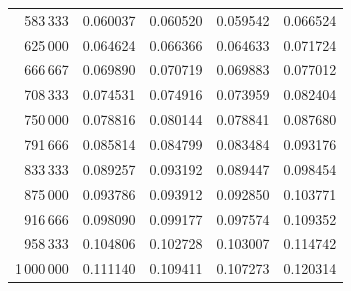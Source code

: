 \begin{table}[!h]
\begin{tabular}{r|rrrr}
        583\,333    & 0.060037        & 0.060520        & 0.059542     & 0.066524  \\
        625\,000    & 0.064624        & 0.066366        & 0.064633     & 0.071724  \\
        666\,667    & 0.069890        & 0.070719        & 0.069883     & 0.077012  \\
        708\,333    & 0.074531        & 0.074916        & 0.073959     & 0.082404  \\
        750\,000    & 0.078816        & 0.080144        & 0.078841     & 0.087680  \\
        791\,666    & 0.085814        & 0.084799        & 0.083484     & 0.093176  \\
        833\,333    & 0.089257        & 0.093192        & 0.089447     & 0.098454  \\
        875\,000    & 0.093786        & 0.093912        & 0.092850     & 0.103771  \\
        916\,666    & 0.098090        & 0.099177        & 0.097574     & 0.109352  \\
        958\,333    & 0.104806        & 0.102728        & 0.103007     & 0.114742  \\
        1\,000\,000 & 0.111140        & 0.109411        & 0.107273     & 0.120314  \\
        \hline
    \end{tabular}
\end{table}

